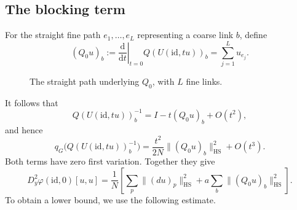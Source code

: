 \documentclass[10pt,reqno]{amsart}
\theoremstyle{definition}
\theoremstyle{remark}
\numberwithin{equation}{section}
\numberwithin{figure}{section}
\newcommand{\dd}{\mathrm d}
\newcommand{\id}{\mathrm{id}}
\begin{document}
\subsection{The blocking term}
For the straight fine path $e_1,\ldots,e_L$ representing a coarse link $b$,
define
\begin{equation}\label{eq:linearised-straight-blocking}
(Q_0u)_b:=\left.\frac{\dd}{\dd t}\right|_{t=0}
Q(U(\id,tu))_b=\sum_{j=1}^Lu_{e_j}.
\end{equation}
\begin{figure}[htbp]
\centering
{}
\caption{The straight path underlying $Q_0$, with $L$ fine links.}
\label{fig:linearised-blocking-path}
\end{figure}
It follows that
\begin{equation}\label{eq:identity-blocking-inverse}
Q(U(\id,tu))_b^{-1}=I-t(Q_0u)_b+O(t^2),
\end{equation}
and hence
\begin{equation}\label{eq:identity-blocking-energy}
q_G\bigl(Q(U(\id,tu))_b^{-1}\bigr)
=\frac{t^2}{2N}\|(Q_0u)_b\|_{\mathrm{HS}}^2+O(t^3).
\end{equation}
Both terms have zero first variation. Together they give
\begin{equation}\label{eq:identity-hessian}
\boxed{D_y^2\varphi(\id,0)[u,u]
=\frac1N\left[\sum_p\|(du)_p\|_{\mathrm{HS}}^2
+a\sum_b\|(Q_0u)_b\|_{\mathrm{HS}}^2\right].}
\end{equation}
To obtain a lower bound, we use the following estimate.
\end{document}
